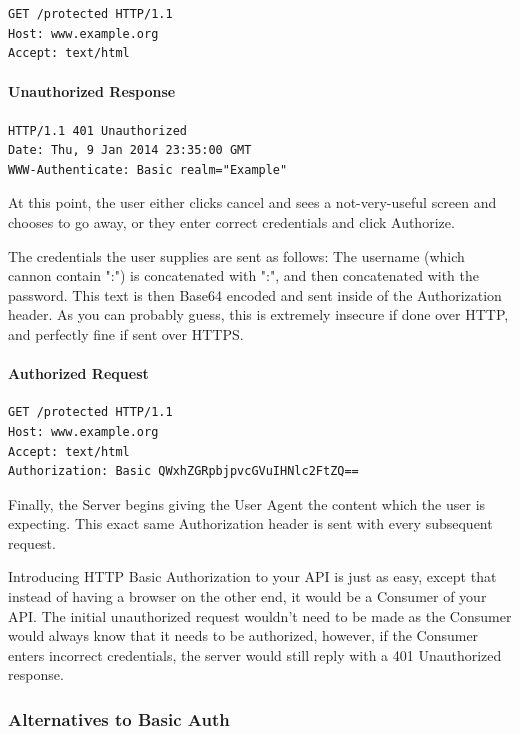 \documentclass{book}
\begin{document}
\begin{verbatim}
GET /protected HTTP/1.1
Host: www.example.org
Accept: text/html
\end{verbatim}

\paragraph{\textbf{Unauthorized Response}}

\begin{verbatim}
HTTP/1.1 401 Unauthorized
Date: Thu, 9 Jan 2014 23:35:00 GMT
WWW-Authenticate: Basic realm="Example"
\end{verbatim}

At this point, the user either clicks cancel and sees a not-very-useful screen and chooses to go away, or they enter correct credentials and click Authorize.

The credentials the user supplies are sent as follows: The username (which cannon contain ":") is concatenated with ":", and then concatenated with the password. This text is then Base64 encoded and sent inside of the Authorization header. As you can probably guess, this is extremely insecure if done over HTTP, and perfectly fine if sent over HTTPS.

\paragraph{\textbf{Authorized Request}}

\begin{verbatim}
GET /protected HTTP/1.1
Host: www.example.org
Accept: text/html
Authorization: Basic QWxhZGRpbjpvcGVuIHNlc2FtZQ==
\end{verbatim}

Finally, the Server begins giving the User Agent the content which the user is expecting. This exact same Authorization header is sent with every subsequent request.

Introducing HTTP Basic Authorization to your API is just as easy, except that instead of having a browser on the other end, it would be a Consumer of your API. The initial unauthorized request wouldn't need to be made as the Consumer would always know that it needs to be authorized, however, if the Consumer enters incorrect credentials, the server would still reply with a 401 Unauthorized response.

\subsubsection{Alternatives to Basic Auth}
\end{document}
